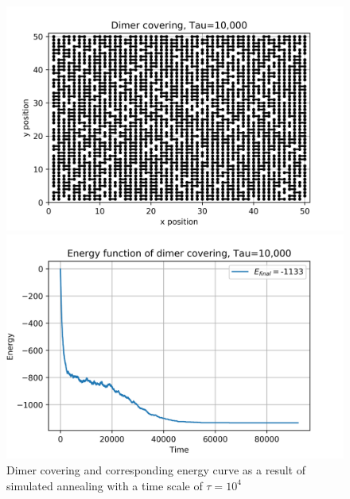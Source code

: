 \documentclass{article}
\begin{document}
\begin{figure}[H]
	\begin{minipage}{0.49\linewidth}
		\includegraphics[width=\linewidth]{../images/q4_dimers_t=1e4.png}
	\end{minipage}
	\begin{minipage}{0.49\linewidth}
		\includegraphics[width=\linewidth]{../images/q4_energy_t=1e4.png}
	\end{minipage}
	\caption{Dimer covering and corresponding energy curve as a result of simulated annealing with a time scale of $\tau = 10^4$}
	\label{fig:q4_dimers_t=1e4}
\end{figure}
\end{document}
